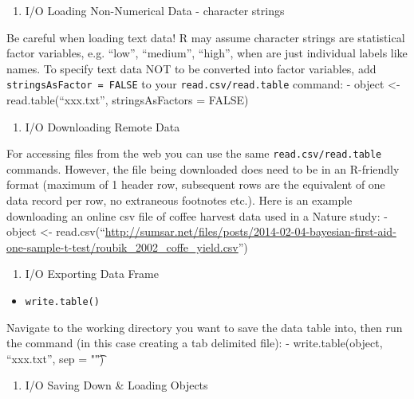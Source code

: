 \documentclass[]{book}
\providecommand{\tightlist}{%
  \setlength{\itemsep}{0pt}\setlength{\parskip}{0pt}}
\begin{document}
\begin{enumerate}
\def\labelenumi{(\alph{enumi})}
\setcounter{enumi}{3}
\tightlist
\item
  I/O Loading Non-Numerical Data - character strings
\end{enumerate}

Be careful when loading text data! R may assume character strings are statistical factor variables, e.g. ``low'', ``medium'', ``high'', when are just individual labels like names. To specify text data NOT to be converted into factor variables, add \texttt{stringsAsFactor\ =\ FALSE} to your \texttt{read.csv/read.table} command:
- object \textless{}- read.table(``xxx.txt'', stringsAsFactors = FALSE)

\begin{enumerate}
\def\labelenumi{(\alph{enumi})}
\setcounter{enumi}{4}
\tightlist
\item
  I/O Downloading Remote Data
\end{enumerate}

For accessing files from the web you can use the same \texttt{read.csv/read.table} commands. However, the file being downloaded does need to be in an R-friendly format (maximum of 1 header row, subsequent rows are the equivalent of one data record per row, no extraneous footnotes etc.). Here is an example downloading an online csv file of coffee harvest data used in a Nature study:
- object \textless{}- read.csv(``\url{http://sumsar.net/files/posts/2014-02-04-bayesian-first-aid-one-sample-t-test/roubik_2002_coffe_yield.csv}'')

\begin{enumerate}
\def\labelenumi{\arabic{enumi}.}
\setcounter{enumi}{6}
\tightlist
\item
  I/O Exporting Data Frame
\end{enumerate}

\begin{itemize}
\tightlist
\item
  \texttt{write.table()}
\end{itemize}

Navigate to the working directory you want to save the data table into, then run the command (in this case creating a tab delimited file):
- write.table(object, ``xxx.txt'', sep = "\t")

\begin{enumerate}
\def\labelenumi{\arabic{enumi}.}
\setcounter{enumi}{7}
\tightlist
\item
  I/O Saving Down \& Loading Objects
\end{enumerate}
\end{document}
